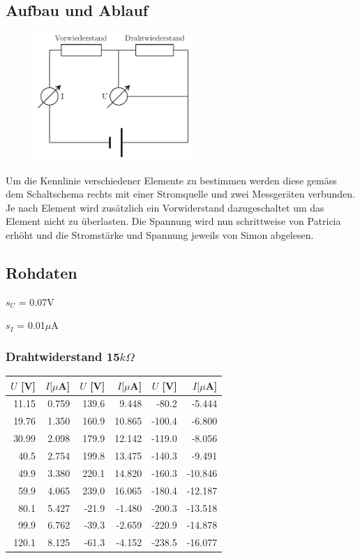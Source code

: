 \documentclass[12pt,a4paper]{article}
\begin{document}
\subsection*{Aufbau und Ablauf}
\begin{figure}
\vspace{-15pt}
\centering
\includegraphics[width=6cm]{illustration.pdf}
\end{figure}
Um die Kennlinie verschiedener Elemente zu bestimmen werden diese gem\"ass dem Schaltschema rechts mit einer Stromquelle und zwei Messger\"aten verbunden. Je nach Element wird zus\"atzlich ein Vorwiderstand dazugeschaltet um das Element nicht zu \"uberlasten. Die Spannung wird nun schrittweise von Patricia erh\"oht und die Stromst\"arke und Spannung jeweils von Simon abgelesen. 


\subsection*{Rohdaten}
$s_U$ = 0.07V

\noindent
$s_I$ = 0.01$\mu$A

\subsubsection*{Drahtwiderstand 15$k\Omega$}
\begin{tabular}{|r|r|r|r|r|r|}
\hline
$U$ [V]&$I [\mu $A]&$U$ [V]&$I [\mu $A]&$U$ [V]&$I [\mu $A]\\
\hline
11.15&0.759&139.6&9.448&-80.2&-5.444\\
19.76&1.350&160.9&10.865&-100.4&-6.800\\
30.99&2.098&179.9&12.142&-119.0&-8.056\\
40.5&2.754&199.8&13.475&-140.3&-9.491\\
49.9&3.380&220.1&14.820&-160.3&-10.846\\
59.9&4.065&239.0&16.065&-180.4&-12.187\\
80.1&5.427&-21.9&-1.480&-200.3&-13.518\\
99.9&6.762&-39.3&-2.659&-220.9&-14.878\\
120.1&8.125&-61.3&-4.152&-238.5&-16.077\\
\hline
\end{tabular}
\end{document}
